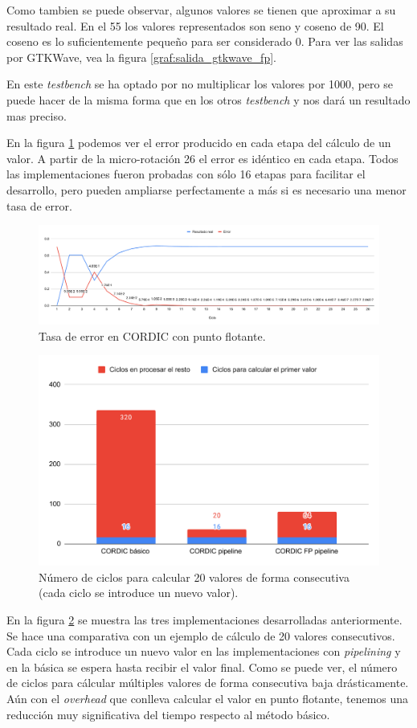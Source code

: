 Como tambien se puede observar, algunos valores se tienen que aproximar a su resultado real. En el  55 los valores representados son seno y coseno de 90. El coseno es lo suficientemente pequeño para ser considerado 0. Para ver las salidas por GTKWave, vea la figura \ref{graf:salida_gtkwave_fp}.

En este \textit{testbench} se ha optado por no multiplicar los valores por 1000, pero se puede hacer de la misma forma que en los otros \textit{testbench} y nos dará un resultado mas preciso.

En la figura \ref{graf:real_error} podemos ver el error producido en cada etapa del cálculo de un valor. A partir de la micro-rotación 26 el error es idéntico en cada etapa. Todos las implementaciones fueron probadas con sólo 16 etapas para facilitar el desarrollo, pero pueden ampliarse perfectamente a más si es necesario una menor tasa de error.
\begin{figure}[ht]
	\centering
	\includegraphics[width=\textwidth]{archivos/CORDIC/real_error2.pdf}
	\caption{Tasa de error en CORDIC con punto flotante.}
	\label{graf:real_error}
\end{figure}


\begin{figure}[H]
	\centering
	\includegraphics[width=\textwidth]{archivos/CORDIC/ciclos.pdf}
	\caption{Número de ciclos para calcular 20 valores de forma consecutiva (cada ciclo se introduce un nuevo valor).}
	\label{graf:ciclos}
\end{figure}

En la figura \ref{graf:ciclos} se muestra las tres implementaciones desarrolladas anteriormente. Se hace una comparativa con un ejemplo de cálculo de 20 valores consecutivos. Cada ciclo se introduce un nuevo valor en las implementaciones con \textit{pipelining} y en la básica se espera hasta recibir el valor final. Como se puede ver, el número de ciclos para cálcular múltiples valores de forma consecutiva baja drásticamente. Aún con el \textit{overhead} que conlleva calcular el valor en punto flotante, tenemos una reducción muy significativa del tiempo respecto al método básico.
